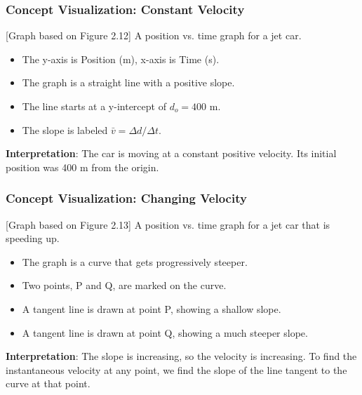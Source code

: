 \documentclass{beamer}
\begin{document}
\begin{frame}
\frametitle{Concept Visualization: Constant Velocity}
\begin{alertblock}{[Graph based on Figure 2.12]}
A position vs. time graph for a jet car.
\begin{itemize}
    \item The y-axis is Position (m), x-axis is Time (s).
    \item The graph is a straight line with a positive slope.
    \item The line starts at a y-intercept of $d_o = 400$ m.
    \item The slope is labeled $\bar{v} = \Delta d / \Delta t$.
\end{itemize}
\end{alertblock}
\pause
\textbf{Interpretation}: The car is moving at a constant positive velocity. Its initial position was 400 m from the origin.
\end{frame}

\begin{frame}
\frametitle{Concept Visualization: Changing Velocity}
\begin{alertblock}{[Graph based on Figure 2.13]}
A position vs. time graph for a jet car that is speeding up.
\begin{itemize}
    \item The graph is a curve that gets progressively steeper.
    \item Two points, P and Q, are marked on the curve.
    \item A tangent line is drawn at point P, showing a shallow slope.
    \item A tangent line is drawn at point Q, showing a much steeper slope.
\end{itemize}
\end{alertblock}
\pause
\textbf{Interpretation}: The slope is increasing, so the velocity is increasing. To find the \alert{instantaneous velocity} at any point, we find the slope of the line tangent to the curve at that point.
\end{frame}
\end{document}
